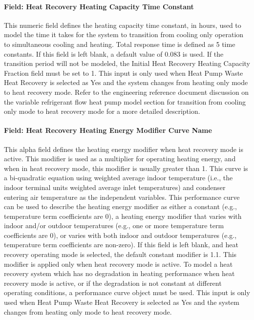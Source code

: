 \paragraph{Field: Heat Recovery Heating Capacity Time Constant}\label{field-heat-recovery-heating-capacity-time-constant}

This numeric field defines the heating capacity time constant, in hours, used to model the time it takes for the system to transition from cooling only operation to simultaneous cooling and heating. Total response time is defined as 5 time constants. If this field is left blank, a default value of 0.083 is used. If the transition period will not be modeled, the Initial Heat Recovery Heating Capacity Fraction field must be set to 1. This input is only used when Heat Pump Waste Heat Recovery is selected as Yes and the system changes from heating only mode to heat recovery mode. Refer to the engineering reference document discussion on the variable refrigerant flow heat pump model section for transition from cooling only mode to heat recovery mode for a more detailed description.

\paragraph{Field: Heat Recovery Heating Energy Modifier Curve Name}\label{field-heat-recovery-heating-energy-modifier-curve-name}

This alpha field defines the heating energy modifier when heat recovery mode is active. This modifier is used as a multiplier for operating heating energy, and when in heat recovery mode, this modifier is usually greater than 1. This curve is a bi-quadratic equation using weighted average indoor temperature (i.e., the indoor terminal units weighted average inlet temperatures) and condenser entering air temperature as the independent variables. This performance curve can be used to describe the heating energy modifier as either a constant (e.g., temperature term coefficients are 0), a heating energy modifier that varies with indoor and/or outdoor temperatures (e.g., one or more temperature term coefficients are 0), or varies with both indoor and outdoor temperatures (e.g., temperature term coefficients are non-zero). If this field is left blank, and heat recovery operating mode is selected, the default constant modifier is 1.1. This modifier is applied only when heat recovery mode is active. To model a heat recovery system which has no degradation in heating performance when heat recovery mode is active, or if the degradation is not constant at different operating conditions, a performance curve object must be used. This input is only used when Heat Pump Waste Heat Recovery is selected as Yes and the system changes from heating only mode to heat recovery mode.

